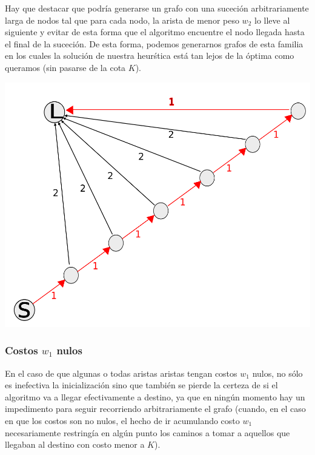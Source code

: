\vspace{2mm}

Hay que destacar que podr\'ia generarse un grafo con una suceci\'on arbitrariamente larga de nodos tal que para cada nodo, la arista de menor peso $w_2$ lo lleve al siguiente y evitar de esta forma que el algoritmo encuentre el nodo llegada hasta el final de la suceci\'on. De esta forma, podemos generarnos grafos de esta familia en los cuales la soluci\'on de nuestra heur\'stica est\'a tan lejos de la \'optima como queramos (sin pasarse de la cota $K$).


\begin{center}
\includegraphics[scale=0.35]{img/grafoChoto.png}
\end{center}

\subsubsection{Costos $w_1$ nulos}

En el caso de que algunas o todas aristas aristas tengan costos $w_1$ nulos, no s\'olo es inefectiva la inicializaci\'on sino que tambi\'en se pierde la certeza de si el algoritmo va a llegar efectivamente a destino, ya que en ning\'un momento hay un impedimento para seguir recorriendo arbitrariamente el grafo (cuando, en el caso en que los costos son no nulos, el hecho de ir acumulando costo $w_1$ necesariamente restring\'ia en alg\'un punto los caminos a tomar a aquellos que llegaban al destino con costo menor a $K$).

\vspace{2mm}

